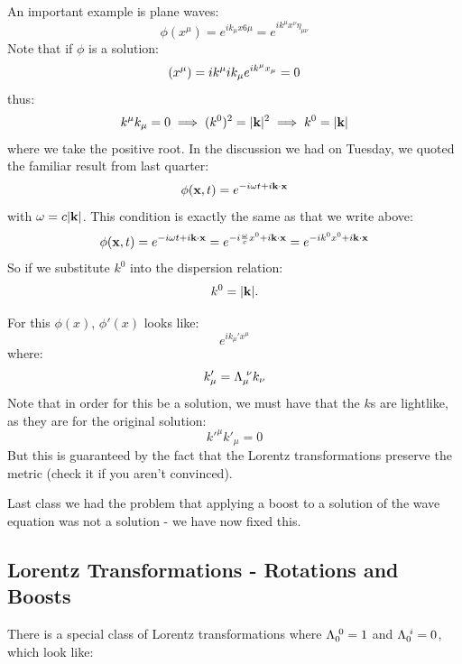 An important example is plane waves:
\begin{equation}
    \phi(x^\mu) = e^{ik_\mu x6\mu} = e^{ik^\mu x^\nu \eta_{\mu\nu}}
\end{equation}
Note that if $\phi$ is a solution:
\begin{equation}
    \box \phi(x^\mu) = ik^\mu ik_\mu e^{ik^\mu x_\mu} = 0
\end{equation}
thus:
\begin{equation}
    k^\mu k_\mu = 0 \implies (k^0)^2 = \lvert \mathbf{k} \rvert^2 \implies k^0 = \lvert \mathbf{k} \rvert
\end{equation}
where we take the positive root. In the discussion we had on Tuesday, we quoted the familiar result from last quarter:
\begin{equation}
    \phi(\mathbf{x}, t) = e^{-i\omega t + i\mathbf{k} \cdot \mathbf{x}}
\end{equation}
with $\omega = c\lvert \mathbf{k} \rvert$. This condition is exactly the same as that we write above:
\begin{equation}
    \phi(\mathbf{x}, t) = e^{-i\omega t + i\mathbf{k} \cdot \mathbf{x}} = e^{-i\frac{\omega}{c}x^0 + i\mathbf{k} \cdot \mathbf{x}} = e^{-ik^0 x^0 + i\mathbf{k}\cdot\mathbf{x}}
\end{equation}
So if we substitute $k^0$ into the dispersion relation:
\begin{equation}
    k^0 = \lvert \mathbf{k} \rvert.
\end{equation}

For this $\phi(x)$, $\phi'(x)$ looks like:
\begin{equation}
    e^{ik_\mu' x^\mu}
\end{equation}
where:
\begin{equation}
    k_\mu' = \Lambda_{\mu}^{\sp\nu}k_\nu
\end{equation}
Note that in order for this be a solution, we must have that the $k$s are lightlike, as they are for the original solution:
\begin{equation}
    k'^\mu k'_\mu = 0
\end{equation}
But this is guaranteed by the fact that the Lorentz transformations preserve the metric (check it if you aren't convinced).

Last class we had the problem that applying a boost to a solution of the wave equation was not a solution - we have now fixed this.

\subsection{Lorentz Transformations - Rotations and Boosts}
There is a special class of Lorentz transformations where $\Lambda_0^{\sp0} = 1$ and $\Lambda_0^{\sp i} = 0$, which look like:

